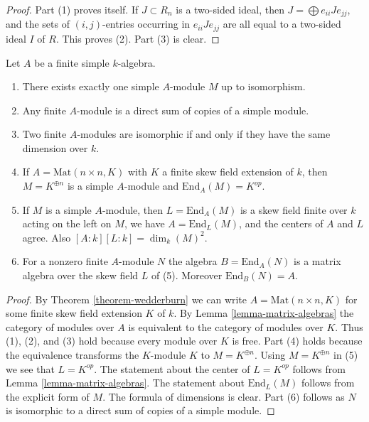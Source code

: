 \begin{proof}
Part (1) proves itself. If $J \subset R_n$ is a two-sided ideal, then
$J = \bigoplus e_{ii}Je_{jj}$, and the sets of $(i,j)$-entries occurring
in $e_{ii}Je_{jj}$ are all equal to a two-sided ideal $I$ of $R$.
This proves (2).
Part (3) is clear.
\end{proof}

\begin{lemma}
\label{lemma-simple-module-unique}
Let $A$ be a finite simple $k$-algebra.
\begin{enumerate}
\item There exists exactly one simple $A$-module $M$ up to isomorphism.
\item Any finite $A$-module is a direct sum of copies of a simple module.
\item Two finite $A$-modules are isomorphic if and only if they
have the same dimension over $k$.
\item If $A = \text{Mat}(n \times n, K)$ with $K$ a finite skew field
extension of $k$, then $M = K^{\oplus n}$ is a simple $A$-module and
$\text{End}_A(M) = K^{op}$.
\item If $M$ is a simple $A$-module, then $L = \text{End}_A(M)$
is a skew field finite over $k$ acting on the left on $M$, we have
$A = \text{End}_L(M)$, and the centers of $A$ and $L$ agree.
Also $[A : k] [L : k] = \dim_k(M)^2$.
\item For a nonzero finite $A$-module $N$ the algebra $B = \text{End}_A(N)$ is a
matrix algebra over the skew field $L$ of (5). Moreover $\text{End}_B(N) = A$.
\end{enumerate}
\end{lemma}

\begin{proof}
By
Theorem \ref{theorem-wedderburn}
we can write $A = \text{Mat}(n \times n, K)$ for some finite skew
field extension $K$ of $k$. By
Lemma \ref{lemma-matrix-algebras}
the category of modules over $A$ is equivalent to the category of
modules over $K$. Thus (1), (2), and (3) hold
because every module over $K$ is free. Part (4) holds
because the equivalence transforms the $K$-module $K$
to $M = K^{\oplus n}$. Using $M = K^{\oplus n}$ in (5)
we see that $L = K^{op}$. The statement about the center of $L = K^{op}$
follows from
Lemma \ref{lemma-matrix-algebras}.
The statement about $\text{End}_L(M)$ follows from the explicit form
of $M$. The formula of dimensions is clear.
Part (6) follows as $N$ is isomorphic to a direct sum of
copies of a simple module.
\end{proof}


